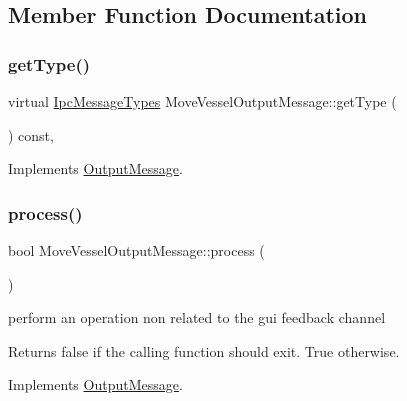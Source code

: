\subsection{Member Function Documentation}
\mbox{\label{class_move_vessel_output_message_a8f31dbcf29eb889a5217abc82f501b4d}} 
\subsubsection{\texorpdfstring{getType()}{getType()}}
{\footnotesize\ttfamily virtual \mbox{\hyperlink{ipcmsgtypes_8h_a59f75a61492e64aebfae0cc49cc26683}{Ipc\+Message\+Types}} Move\+Vessel\+Output\+Message\+::get\+Type (\begin{DoxyParamCaption}{ }\end{DoxyParamCaption}) const\hspace{0.3cm}{\ttfamily [inline]}, {\ttfamily [virtual]}}



Implements \mbox{\hyperlink{class_output_message_adfc965910862cd236e437e3050aee176}{Output\+Message}}.

\mbox{\label{class_move_vessel_output_message_ab503e94c98c0a66470a283cbf5b29c78}} 
\subsubsection{\texorpdfstring{process()}{process()}}
{\footnotesize\ttfamily bool Move\+Vessel\+Output\+Message\+::process (\begin{DoxyParamCaption}{ }\end{DoxyParamCaption})\hspace{0.3cm}{\ttfamily [virtual]}}



perform an operation non related to the gui feedback channel 

\begin{DoxyReturn}{Returns}
false if the calling function should exit. True otherwise. 
\end{DoxyReturn}


Implements \mbox{\hyperlink{class_output_message_a949d8350d98202608e4248fe6dafa10f}{Output\+Message}}.

